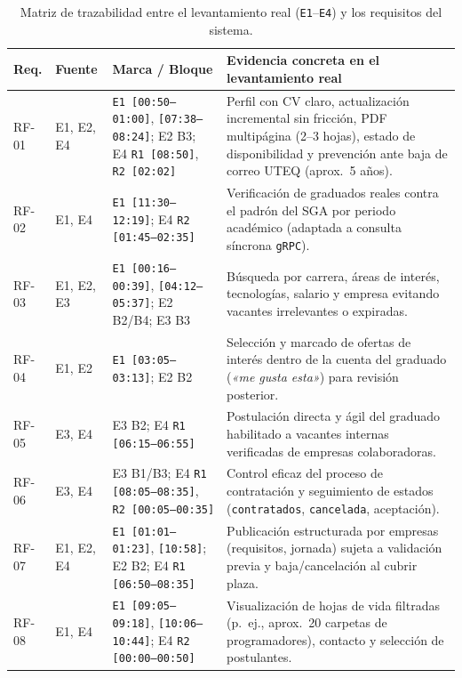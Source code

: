 \documentclass[11pt,a4paper]{article}
\begin{document}
\begin{table}[htbp]
\centering
\caption{Matriz de trazabilidad entre el levantamiento real (\texttt{E1}--\texttt{E4}) y los requisitos del sistema.}
\label{tab:trazabilidad-requisitos}
\footnotesize
\begin{tabularx}{\textwidth}{l >{\raggedright\arraybackslash}p{1.2cm} >{\raggedright\arraybackslash}p{3.4cm} X}
\toprule
\textbf{Req.} & \textbf{Fuente} & \textbf{Marca / Bloque} & \textbf{Evidencia concreta en el levantamiento real} \\
\midrule
RF-01 & E1, E2, E4 & \texttt{E1 [00:50--01:00]}, \texttt{[07:38--08:24]}; E2 B3; E4 \texttt{R1 [08:50]}, \texttt{R2 [02:02]} & Perfil con CV claro, actualización incremental sin fricción, PDF multipágina (2--3 hojas), estado de disponibilidad y prevención ante baja de correo UTEQ (aprox.\ 5 años). \\
RF-02 & E1, E4 & \texttt{E1 [11:30--12:19]}; E4 \texttt{R2 [01:45--02:35]} & Verificación de graduados reales contra el padrón del SGA por periodo académico (adaptada a consulta síncrona \texttt{gRPC}). \\
RF-03 & E1, E2, E3 & \texttt{E1 [00:16--00:39]}, \texttt{[04:12--05:37]}; E2 B2/B4; E3 B3 & Búsqueda por carrera, áreas de interés, tecnologías, salario y empresa evitando vacantes irrelevantes o expiradas. \\
RF-04 & E1, E2 & \texttt{E1 [03:05--03:13]}; E2 B2 & Selección y marcado de ofertas de interés dentro de la cuenta del graduado (\textit{«me gusta esta»}) para revisión posterior. \\
RF-05 & E3, E4 & E3 B2; E4 \texttt{R1 [06:15--06:55]} & Postulación directa y ágil del graduado habilitado a vacantes internas verificadas de empresas colaboradoras. \\
RF-06 & E3, E4 & E3 B1/B3; E4 \texttt{R1 [08:05--08:35]}, \texttt{R2 [00:05--00:35]} & Control eficaz del proceso de contratación y seguimiento de estados (\texttt{contratados}, \texttt{cancelada}, aceptación). \\
RF-07 & E1, E2, E4 & \texttt{E1 [01:01--01:23]}, \texttt{[10:58]}; E2 B2; E4 \texttt{R1 [06:50--08:35]} & Publicación estructurada por empresas (requisitos, jornada) sujeta a validación previa y baja/cancelación al cubrir plaza. \\
RF-08 & E1, E4 & \texttt{E1 [09:05--09:18]}, \texttt{[10:06--10:44]}; E4 \texttt{R2 [00:00--00:50]} & Visualización de hojas de vida filtradas (p.~ej., aprox.\ 20 carpetas de programadores), contacto y selección de postulantes. \\

\end{tabularx}
\end{table}
\end{document}
